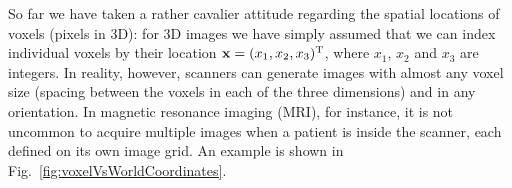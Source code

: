 \documentclass[10pt,twoside]{book}
\begin{document}
% 
% 
%
%
%
% 
%  
%

So far we have taken a rather cavalier attitude regarding the spatial locations of voxels (pixels in 3D): for 3D images we have simply assumed that we can index individual voxels by their location $\mathbf{x} = (x_1, x_2, x_3)^\mathrm{T}$, where $x_1$, $x_2$ and $x_3$ are integers. In reality, however, scanners can generate images with almost any voxel size (spacing between the voxels in each of the three dimensions) and in any orientation. In magnetic resonance imaging (MRI), for instance, it is not uncommon to acquire multiple images when a patient is inside the scanner, each defined on its own image grid. An example is shown in Fig.~\ref{fig:voxelVsWorldCoordinates}.
\end{document}

